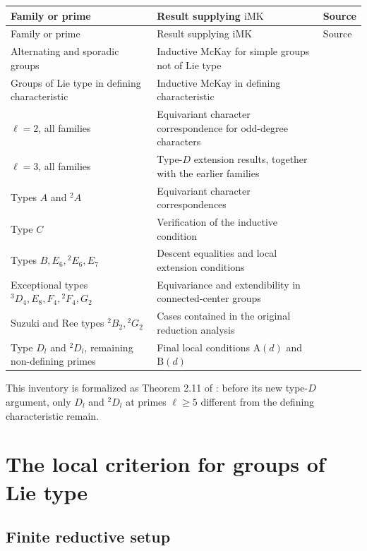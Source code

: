 \documentclass[11pt]{article}
\newcommand{\IMK}{\mathrm{iMK}}
\newcommand{\Ad}{\mathrm{A}(d)}
\newcommand{\Bd}{\mathrm{B}(d)}
\begin{document}
\begin{longtable}{p{}p{}p{}}
\toprule
Family or prime & Result supplying \(\IMK\) & Source \\
\midrule
\endfirsthead
\toprule
Family or prime & Result supplying \(\IMK\) & Source \\
\midrule
\endhead
Alternating and sporadic groups
  & Inductive McKay for simple groups not of Lie type
  & \cite{Malle2008} \\
Groups of Lie type in defining characteristic
  & Inductive McKay in defining characteristic
  & \cite{Spath2012} \\
\(\ell=2\), all families
  & Equivariant character correspondence for odd-degree characters
  & \cite{MalleSpath2016} \\
\(\ell=3\), all families
  & Type-\(D\) extension results, together with the earlier families
  & \cite{Spath2025II} \\
Types \(A\) and \({}^{2}A\)
  & Equivariant character correspondences
  & \cite{CabanesSpath2017A} \\
Type \(C\)
  & Verification of the inductive condition
  & \cite{CabanesSpath2017C} \\
Types \(B,E_6,{}^{2}E_6,E_7\)
  & Descent equalities and local extension conditions
  & \cite{CabanesSpath2019} \\
Exceptional types \({}^{3}D_4,E_8,F_4,{}^{2}F_4,G_2\)
  & Equivariance and extendibility in connected-center groups
  & \cite{CabanesSpath2013} \\
Suzuki and Ree types \({}^{2}B_2,{}^{2}G_2\)
  & Cases contained in the original reduction analysis
  & \cite{IsaacsMalleNavarro2007} \\
Type \(D_l\) and \({}^{2}D_l\), remaining non-defining primes
  & Final local conditions \(\Ad\) and \(\Bd\)
  & \cite{CabanesSpath2026} \\
\bottomrule
\end{longtable}

This inventory is formalized as Theorem 2.11 of
\cite{CabanesSpath2026}: before its new type-\(D\) argument, only
\(D_l\) and \({}^{2}D_l\) at primes \(\ell\geq5\) different from the
defining characteristic remain.

\section{The local criterion for groups of Lie type}

\subsection{Finite reductive setup}
\end{document}
